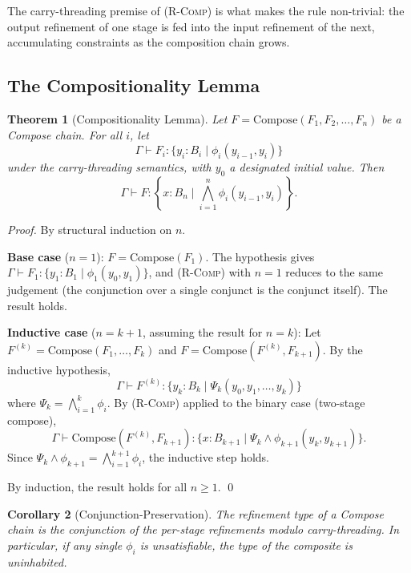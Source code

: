 \documentclass[twocolumn,11pt,a4paper]{article}
\newtheorem{theorem}{Theorem}[section]
\newtheorem{corollary}[theorem]{Corollary}
\newcommand{\Frag}{F}
\newcommand{\Ctx}{\Gamma}
\newcommand{\rul}[1]{\textsc{(#1)}}
\newcommand{\vComp}[1]{\mathrm{Compose}(#1)}
\begin{document}
The carry-threading premise of \rul{R-Comp} is what makes the rule non-trivial: the output refinement of one stage is fed into the input refinement of the next, accumulating constraints as the composition chain grows.

\subsection{The Compositionality Lemma}

\begin{theorem}[Compositionality Lemma]
\label{thm:compositionality}
Let $\Frag = \vComp{\Frag_1, \Frag_2, \ldots, \Frag_n}$ be a Compose chain. For all $i$, let
\[
\Ctx \vdash \Frag_i : \{y_i : B_i \mid \phi_i(y_{i-1}, y_i)\}
\]
under the carry-threading semantics, with $y_0$ a designated initial value. Then
\[
\Ctx \vdash \Frag : \left\{x : B_n \mid \bigwedge_{i=1}^n \phi_i(y_{i-1}, y_i)\right\}.
\]
\end{theorem}

\begin{proof}
By structural induction on $n$.

\textbf{Base case} ($n = 1$): $\Frag = \vComp{\Frag_1}$. The hypothesis gives $\Ctx \vdash \Frag_1 : \{y_1 : B_1 \mid \phi_1(y_0, y_1)\}$, and \rul{R-Comp} with $n = 1$ reduces to the same judgement (the conjunction over a single conjunct is the conjunct itself). The result holds.

\textbf{Inductive case} ($n = k+1$, assuming the result for $n = k$): Let $\Frag^{(k)} = \vComp{\Frag_1, \ldots, \Frag_k}$ and $\Frag = \vComp{\Frag^{(k)}, \Frag_{k+1}}$. By the inductive hypothesis,
\[
\Ctx \vdash \Frag^{(k)} : \{y_k : B_k \mid \Psi_k(y_0, y_1, \ldots, y_k)\}
\]
where $\Psi_k = \bigwedge_{i=1}^k \phi_i$. By \rul{R-Comp} applied to the binary case (two-stage compose),
\[
\Ctx \vdash \vComp{\Frag^{(k)}, \Frag_{k+1}} : \{x : B_{k+1} \mid \Psi_k \wedge \phi_{k+1}(y_k, y_{k+1})\}.
\]
Since $\Psi_k \wedge \phi_{k+1} = \bigwedge_{i=1}^{k+1} \phi_i$, the inductive step holds.

By induction, the result holds for all $n \geq 1$. \qed
\end{proof}

\begin{corollary}[Conjunction-Preservation]
\label{cor:conj-preserve}
The refinement type of a Compose chain is the conjunction of the per-stage refinements modulo carry-threading. In particular, if any single $\phi_i$ is unsatisfiable, the type of the composite is uninhabited.
\end{corollary}
\end{document}
